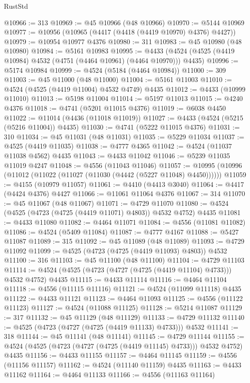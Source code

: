 \begin{lexlean}{RustStd}
\begin{coremodule}
@10966 := 313
@10969 := @45 @10966 (@48 @10966)
@10970 := @5144 @10969
@10977 := @10956 (@10965 (@4417 (@4418 (@4419 @10970) @4376) @4427))
@10979 := @10954 @10977 @4376
@10980 := 311
@10983 := @45 @10980 (@48 @10980)
@10984 := @5161 @10983
@10995 := @4433 (@4524 (@4525 (@4419 @10984) @4532 (@4751 (@4464 @10961) (@4464 @10970))) @4435)
@10996 := @5174 @10984
@10999 := @4524 (@5184 (@4464 @10984))
@11000 := 309
@11003 := @45 @11000 (@48 @11000)
@11004 := @5161 @11003
@11010 := @4524 (@4525 (@4419 @11004) @4532 @4749) @4435
@11012 := @4433 (@10999 @11010)
@11013 := @5198 @11004
@11014 := @5197 @11013
@11015 := @4240 @4376
@11018 := @4741 (@5201 @11015 @4376)
@11019 := @6038 @4450
@11022 := @11014 (@4436 (@11018 @11019))
@11027 := @4433 (@4524 (@5215 (@5216 @11004)) @4435)
@11030 := @4741 (@5222 @11015 @4376)
@11031 := 310
@11034 := @45 @11031 (@48 @11031)
@11035 := @5229 @11034
@11037 := @4525 (@4419 @11035)
@11038 := @4777 @4365
@11042 := @4524 (@11037 @11038 @4562) @4435
@11043 := @4433 @11042
@11046 := @5239 @11035 @11019 @4247
@11048 := @4556 (@11043 @11046)
@11057 := @10995 (@10996 (@11012 (@11022 (@11027 (@11030 (@4442 (@5227 @11048) @4450))))))
@11059 := @4155 (@10979 @11057)
@11061 := @4410 (@4413 @3040)
@11064 := @4417 (@4424 @4376) @4427
@11066 := @11061 @11064 @4376
@11067 := 314
@11070 := @45 @11067 (@48 @11067)
@11071 := @4729 @11070
@11080 := @4524 (@4525 (@4723 (@4725 (@4419 @11071) @4803)) @4532 @4752) @4435
@11081 := @4433 @11080
@11082 := @4464 @11071
@11084 := @4556 (@11081 @11082)
@11086 := @4524 (@5409 @11084)
@11087 := @4777 @4167
@11088 := @5427 @11087
@11089 := 315
@11092 := @45 @11089 (@48 @11089)
@11093 := @4729 @11092
@11099 := @4525 (@4723 (@4725 (@4419 @11093) @4803)) @4532
@11100 := 316
@11103 := @45 @11100 (@48 @11100)
@11104 := @4729 @11103
@11114 := @4524 (@4525 (@4723 (@4727 (@4725 (@4419 @11104) @4733))) @4532 @4752) @4435
@11115 := @4433 @11114
@11116 := @4464 @11104
@11118 := @4556 (@11115 @11116)
@11121 := @4524 (@11099 @11118) @4435
@11122 := @4433 @11121
@11123 := @4464 @11093
@11125 := @4556 (@11122 @11123)
@11127 := @4524 (@11088 @11125)
@11128 := @5214 @11087
@11129 := 317
@11132 := @45 @11129 (@48 @11129)
@11133 := @4729 @11132
@11140 := @4525 (@4723 (@4727 (@4725 (@4419 @11133) @4733))) @4532
@11141 := 318
@11144 := @45 @11141 (@48 @11141)
@11145 := @4729 @11144
@11155 := @4524 (@4525 (@4723 (@4727 (@4725 (@4419 @11145) @4733))) @4532 @4752) @4435
@11156 := @4433 @11155
@11157 := @4464 @11145
@11159 := @4556 (@11156 @11157)
@11162 := @4524 (@11140 @11159) @4435
@11163 := @4433 @11162
@11164 := @4464 @11133
@11166 := @4556 (@11163 @11164)

\end{coremodule}
\end{lexlean}
